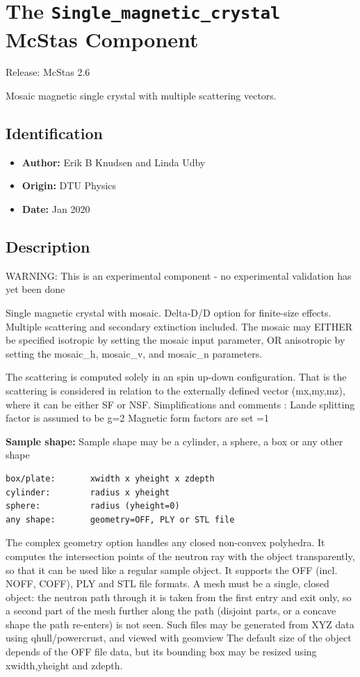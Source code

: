 \section{The \texttt{Single\_magnetic\_crystal} McStas Component}
Release: McStas 2.6

Mosaic magnetic single crystal with multiple scattering vectors.

\subsection*{Identification}
\begin{itemize}
  \item \textbf{Author:} Erik B Knudsen and Linda Udby
  \item \textbf{Origin:} DTU Physics
  \item \textbf{Date:} Jan 2020
\end{itemize}

\subsection*{Description}
WARNING: This is an experimental component - no experimental validation has yet been done

Single magnetic crystal with mosaic. Delta-D/D option for finite-size effects. Multiple scattering and secondary extinction included. The mosaic may EITHER be specified isotropic by setting the mosaic input parameter, OR anisotropic by setting the mosaic\_h, mosaic\_v, and mosaic\_n parameters.

The scattering is computed solely in an spin up-down configuration. That is the scattering is considered in relation to the externally defined vector (mx,my,mz), where it can be either SF or NSF. Simplifications and comments : Lande splitting factor is assumed to be g=2 Magnetic form factors are set =1

\textbf{Sample shape:} Sample shape may be a cylinder, a sphere, a box or any other shape

\begin{verbatim}
box/plate:       xwidth x yheight x zdepth
cylinder:        radius x yheight
sphere:          radius (yheight=0)
any shape:       geometry=OFF, PLY or STL file
\end{verbatim}

The complex geometry option handles any closed non-convex polyhedra. It computes the intersection points of the neutron ray with the object transparently, so that it can be used like a regular sample object. It supports the OFF (incl. NOFF, COFF), PLY and STL file formats. A mesh must be a single, closed object: the neutron path through it is taken from the first entry and exit only, so a second part of the mesh further along the path (disjoint parts, or a concave shape the path re-enters) is not seen. Such files may be generated from XYZ data using qhull/powercrust, and viewed with geomview The default size of the object depends of the OFF file data, but its bounding box may be resized using xwidth,yheight and zdepth.


